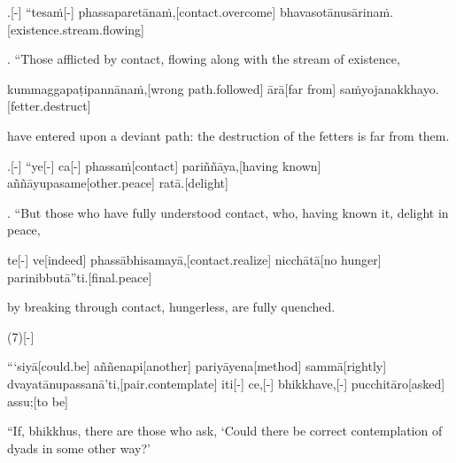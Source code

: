 \vskip 0.2in
\begin{samepage}
.[-] “tesaṁ[-] phassaparetānaṁ,[contact.overcome] bhavasotānusārinaṁ.[existence.stream.flowing]
\endgl
\nopagebreak
\linespread{0.5}
\begin{spacin}{0.2}
{. “Those afflicted by contact, flowing along with the stream of existence,}
\end{spacin}
\vskip 12pt
\end{samepage}
\begin{samepage}
\begingl[glneveryline={\PaliGlossA,\PaliGlossB}]
kummaggapaṭipannānaṁ,[wrong path.followed] ārā[far from] saṁyojanakkhayo.[fetter.destruct]
\endgl
\nopagebreak
\linespread{0.5}
\begin{spacin}{0.2}
{\PaliGlossFT have entered upon a deviant path: the destruction of the fetters is far from them.}
\end{spacin}
\vskip 12pt
\end{samepage}
\begin{samepage}
.[-] “ye[-] ca[-] phassaṁ[contact] pariññāya,[having known] aññāyupasame[other.peace] ratā.[delight]
\endgl
\nopagebreak
\linespread{0.5}
\begin{spacin}{0.2}
{. “But those who have fully understood contact, who, having known it, delight in peace,}
\end{spacin}
\vskip 12pt
\end{samepage}
\begin{samepage}
\begingl[glneveryline={\PaliGlossA,\PaliGlossB}]
te[-] ve[indeed] phassābhisamayā,[contact.realize] nicchātā[no hunger] parinibbutā”ti.[final.peace]
\endgl
\nopagebreak
\linespread{0.5}
\begin{spacin}{0.2}
{\PaliGlossFT by breaking through contact, hungerless, are fully quenched.}
\end{spacin}
\vskip 12pt
\end{samepage}
\vskip 0.2in
\begin{samepage}
\begingl[glneveryline={\PaliGlossA,\PaliGlossB}]
(7)[-]
\endgl
\nopagebreak
\linespread{0.5}
\begin{spacin}{0.2}
{\PaliGlossFT [7. Feeling]}
\end{spacin}
\vskip 12pt
\end{samepage}
\begin{samepage}
\begingl[glneveryline={\PaliGlossA,\PaliGlossB}]
“‘siyā[could.be] aññenapi[another] pariyāyena[method] sammā[rightly] dvayatānupassanā’ti,[pair.contemplate] iti[-] ce,[-] bhikkhave,[-] pucchitāro[asked] assu;[to be]
\endgl
\nopagebreak
\linespread{0.5}
\begin{spacin}{0.2}
{\PaliGlossFT “If, bhikkhus, there are those who ask, ‘Could there be correct contemplation of dyads in some other way?’}
\end{spacin}
\vskip 12pt
\end{samepage}
